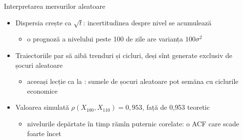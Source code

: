 \begin{frame}{Interpretarea mersurilor aleatoare}
\itemsize{\small}
\begin{itemize}
    \item Dispersia crește ca $\sqrt{t}$: incertitudinea despre nivel se acumulează
    \begin{itemize}
        \item o prognoză a nivelului peste 100 de zile are varianța $100\sigma^2$
    \end{itemize}
    \item Traiectoriile par să aibă trenduri și cicluri, deși sînt generate exclusiv de șocuri aleatoare
    \begin{itemize}
        \item aceeași lecție ca la : sumele de șocuri aleatoare pot semăna cu ciclurile economice
    \end{itemize}
    \item Valoarea simulată $\rho(X_{100}, X_{110}) = 0{,}953$, față de 0{,}953 teoretic
    \begin{itemize}
        \item nivelurile depărtate în timp rămîn puternic corelate: o ACF care scade foarte încet
    \end{itemize}
\end{itemize}
\end{frame}

